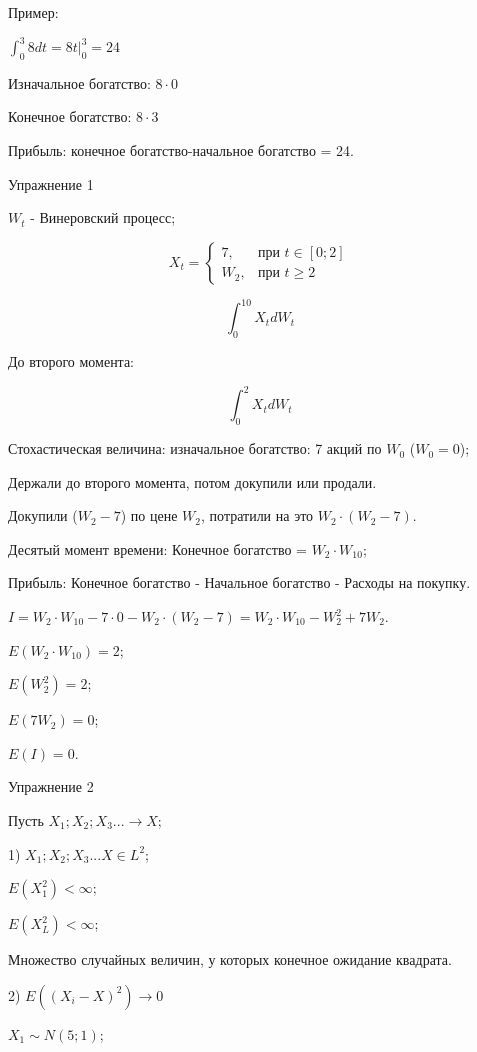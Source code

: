 \documentclass{article}
\begin{document}
Пример:

$\int_{0}^{3} 8 dt=8 t | _0^3=24$

Изначальное богатство: $8\cdot0$

Конечное богатство: $8\cdot3$

Прибыль: конечное богатство-начальное богатство = 24.

Упражнение 1

\parindent=1cm


$W_t$ - Винеровский процесс;

\begin{equation*}
X_t =
 \begin{cases}
   7, &\text{при $t \in [0;2]$}\\
   W_2, &\text{при $t\ge2$}
 \end{cases}
\end{equation*}

$$\int_{0}^{10} X_t dW_t$$

До второго момента:

$$\int_{0}^{2} X_t dW_t$$

Стохастическая величина: изначальное богатство: 7 акций по $W_0$ ($W_0=0$);

Держали до второго момента, потом докупили или продали.

Докупили ($W_2-7$) по цене $W_2$, потратили на это $W_2\cdot (W_2-7)$.

Десятый момент времени: Конечное богатство = $W_2\cdot W_{10}$;

Прибыль: Конечное богатство - Начальное богатство - Расходы на покупку.

$I=W_2\cdot W_{10}-7\cdot 0-W_2\cdot (W_2-7)=W_2\cdot W_{10}-W_2^2+7W_2$.

$E(W_2\cdot W_{10})=2$;

$E(W_2^2)=2$;

$E(7W_2)=0$;

$E(I)=0$.

Упражнение 2

\parindent=1cm


Пусть $X_1;X_2;X_3...\to X$;

1) $X_1;X_2;X_3...X \in L^2$;

$E(X_1^2)<\infty$;

$E(X_L^2)<\infty$;

Множество случайных величин, у которых конечное ожидание квадрата.

2) $E((X_i-X)^2) \to 0$

$X_1 \sim N (5;1)$;
\end{document}
